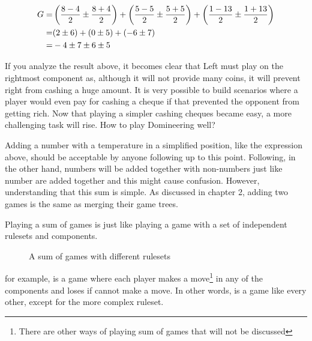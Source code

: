 \begin{align*}
	\mbox{$G$} =& \left(\frac{8-4}{2} \pm \frac{8+4}{2}\right) + \left(\frac{5-5}{2} \pm \frac{5+5}{2}\right) + \left(\frac{1-13}{2} \pm \frac{1+13}{2}\right) \\
	  =& (2 \pm 6) + (0 \pm 5) + (-6 \pm 7)\\
	  =& -4 \pm 7 \pm 6 \pm 5
\end{align*}

If you analyze the result above, it becomes clear that Left must play on the rightmost component as, although it will not provide many coins, it will prevent right from cashing a huge amount. It is very possible to build scenarios where a player would even pay for cashing a cheque if that prevented the opponent from getting rich. Now that playing a simpler cashing cheques became easy, a more challenging task will rise. How to play Domineering well?

Adding a number with a temperature in a simplified position, like the expression above, should be acceptable by anyone following up to this point. Following, in the other hand, numbers will be added together with non-numbers just like number are added together and this might cause confusion. However, understanding that this sum is simple. As discussed in chapter 2, adding two games is the same as merging their game trees.

Playing a sum of games is just like playing a game with a set of independent rulesets and components.

\begin{figure}[H]
\begin{center}
\end{center}
\caption{A sum of games with different rulesets}
\end{figure}

for example, is a game where each player makes a move\footnote{There are other ways of playing sum of games that will not be discussed} in any of the components and loses if cannot make a move. In other words, \Gm{} is a game like every other, except for the more complex ruleset.

